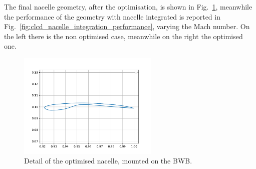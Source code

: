 The final nacelle geometry, after the optimisation, is shown in Fig.~\ref{fig:bwb_nacelle_geom_detail}, meanwhile the performance of the geometry with nacelle integrated is reported in Fig.~\ref{fig:clcd_nacelle_integration_performance}, varying the Mach number. 
On the left there is the non optimised case, meanwhile on the right the optimised one.
\begin{figure}[!h]
	\centering
	\includegraphics[keepaspectratio, width=0.6\textwidth]{images/chap4/bwb_nacelle_geom_detail}
	\caption{Detail of the optimised nacelle, mounted on the BWB.}
	\label{fig:bwb_nacelle_geom_detail}
\end{figure}
